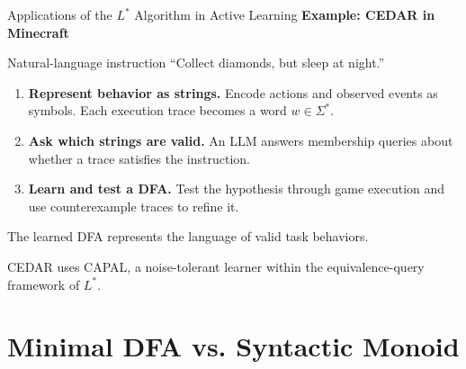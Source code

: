 \documentclass{beamer}
\begin{document}
\begin{frame}{\fontsize{12}{14}\selectfont Applications of the $L^*$ Algorithm in Active Learning}
    \small
    \textbf{Example: CEDAR in Minecraft}~\cite{chen2026cedar}

    \begin{block}{Natural-language instruction}
        ``Collect diamonds, but sleep at night.''
    \end{block}

    \begin{enumerate}
        \setlength{\itemsep}{5pt}
        \item \textbf{Represent behavior as strings.}
        Encode actions and observed events as symbols.
        Each execution trace becomes a word $w\in\Sigma^*$.
        \item \textbf{Ask which strings are valid.}
        An LLM answers membership queries about whether a trace
        satisfies the instruction.
        \item \textbf{Learn and test a DFA.}
        Test the hypothesis through game execution and use
        counterexample traces to refine it.
    \end{enumerate}

    \medskip
    The learned DFA represents the language of valid task behaviors.

    \medskip
    {\footnotesize CEDAR uses CAPAL, a noise-tolerant learner within
    the equivalence-query framework of $L^*$.}
\end{frame}


\section{Minimal DFA vs. Syntactic Monoid}
\end{document}
